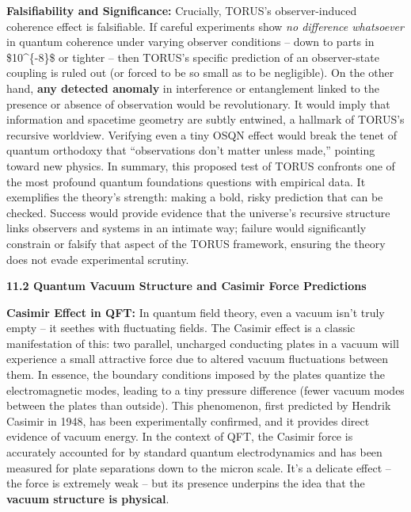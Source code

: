\documentclass[
]{article}
\begin{document}
{\textbf{Falsifiability and Significance:} Crucially, TORUS's
observer-induced coherence effect is falsifiable. If careful experiments
show \emph{no difference whatsoever} in quantum coherence under varying
observer conditions -- down to parts in \$10\^{}\{-8\}\$ or tighter --
then TORUS's specific prediction of an observer-state coupling is ruled
out (or forced to be so small as to be negligible)\hspace{0pt}. On the
other hand, \textbf{any detected anomaly} in interference or
entanglement linked to the presence or absence of observation would be
revolutionary. It would imply that information and spacetime geometry
are subtly entwined, a hallmark of TORUS's recursive
worldview\hspace{0pt}. Verifying even a tiny OSQN effect would break the
tenet of quantum orthodoxy that ``observations don't matter unless
made,'' pointing toward new physics. In summary, this proposed test of
TORUS confronts one of the most profound quantum foundations questions
with empirical data. It exemplifies the theory's strength: making a
bold, risky prediction that can be checked. Success would provide
evidence that the universe's recursive structure links observers and
systems in an intimate way; failure would significantly constrain or
falsify that aspect of the TORUS framework, ensuring the theory does not
evade experimental scrutiny.

\textbf{11.2 Quantum Vacuum Structure and Casimir Force Predictions}

\textbf{Casimir Effect in QFT:} In quantum field theory, even a vacuum
isn't truly empty -- it seethes with fluctuating fields. The Casimir
effect is a classic manifestation of this: two parallel, uncharged
conducting plates in a vacuum will experience a small attractive force
due to altered vacuum fluctuations between them\hspace{0pt}. In essence,
the boundary conditions imposed by the plates quantize the
electromagnetic modes, leading to a tiny pressure difference (fewer
vacuum modes between the plates than outside)\hspace{0pt}. This
phenomenon, first predicted by Hendrik Casimir in 1948, has been
experimentally confirmed, and it provides direct evidence of vacuum
energy. In the context of QFT, the Casimir force is accurately accounted
for by standard quantum electrodynamics and has been measured for plate
separations down to the micron scale. It's a delicate effect -- the
force is extremely weak -- but its presence underpins the idea that the
\textbf{vacuum structure is physical}.

}
\end{document}
